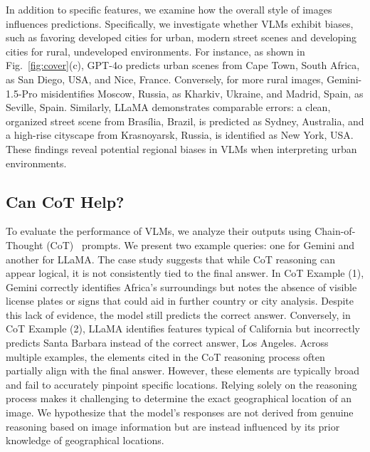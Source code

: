 In addition to specific features, we examine how the overall style of images influences predictions.
Specifically, we investigate whether VLMs exhibit biases, such as favoring developed cities for urban, modern street scenes and developing cities for rural, undeveloped environments.
For instance, as shown in Fig.~\ref{fig:cover}(c), GPT-4o predicts urban scenes from Cape Town, South Africa, as San Diego, USA, and Nice, France.
Conversely, for more rural images, Gemini-1.5-Pro misidentifies Moscow, Russia, as Kharkiv, Ukraine, and Madrid, Spain, as Seville, Spain.
Similarly, LLaMA demonstrates comparable errors: a clean, organized street scene from Bras\'ilia, Brazil, is predicted as Sydney, Australia, and a high-rise cityscape from Krasnoyarsk, Russia, is identified as New York, USA.
These findings reveal potential regional biases in VLMs when interpreting urban environments.

\subsection{Can CoT Help?}

To evaluate the performance of VLMs, we analyze their outputs using Chain-of-Thought (CoT)~\cite{kojima2022large, wei2022chain} prompts.
We present two example queries: one for Gemini and another for LLaMA.
The case study suggests that while CoT reasoning can appear logical, it is not consistently tied to the final answer.
In CoT Example (1), Gemini correctly identifies Africa’s surroundings but notes the absence of visible license plates or signs that could aid in further country or city analysis.
Despite this lack of evidence, the model still predicts the correct answer.
Conversely, in CoT Example (2), LLaMA identifies features typical of California but incorrectly predicts Santa Barbara instead of the correct answer, Los Angeles.
Across multiple examples, the elements cited in the CoT reasoning process often partially align with the final answer.
However, these elements are typically broad and fail to accurately pinpoint specific locations.
Relying solely on the reasoning process makes it challenging to determine the exact geographical location of an image.
We hypothesize that the model's responses are not derived from genuine reasoning based on image information but are instead influenced by its prior knowledge of geographical locations.

